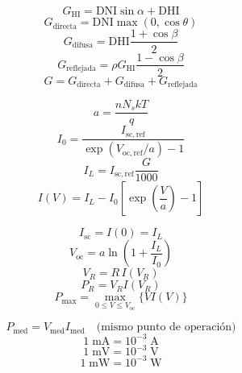 \[
G_{\mathrm{HI}}=\mathrm{DNI}\sin\alpha+\mathrm{DHI}
\]
\[
G_{\mathrm{directa}}=\mathrm{DNI}\max(0,\cos\theta)
\]
\[
G_{\mathrm{difusa}}=\mathrm{DHI}\frac{1+\cos\beta}{2}
\]
\[
G_{\mathrm{reflejada}}=\rho G_{\mathrm{HI}}\frac{1-\cos\beta}{2}
\]
\[
G=G_{\mathrm{directa}}+G_{\mathrm{difusa}}+G_{\mathrm{reflejada}}
\]

\[
a=\frac{nN_s kT}{q}
\]
\[
I_0=\frac{I_{\mathrm{sc,ref}}}{\exp(V_{\mathrm{oc,ref}}/a)-1}
\]
\[
I_L=I_{\mathrm{sc,ref}}\frac{G}{1000}
\]
\[
I(V)=I_L-I_0\left[\exp\left(\frac{V}{a}\right)-1\right]
\]

\[
I_{\mathrm{sc}}=I(0)=I_L
\]
\[
V_{\mathrm{oc}}=a\ln\left(1+\frac{I_L}{I_0}\right)
\]
\[
V_R=R\,I(V_R)
\]
\[
P_R=V_R I(V_R)
\]
\[
P_{\max}=\max_{0\le V\le V_{\mathrm{oc}}}\{V I(V)\}
\]

\[
P_{\mathrm{med}}=V_{\mathrm{med}}I_{\mathrm{med}}\quad\text{(mismo punto de operación)}
\]
\[
1\;\mathrm{mA}=10^{-3}\;\mathrm{A}
\]
\[
1\;\mathrm{mV}=10^{-3}\;\mathrm{V}
\]
\[
1\;\mathrm{mW}=10^{-3}\;\mathrm{W}
\]